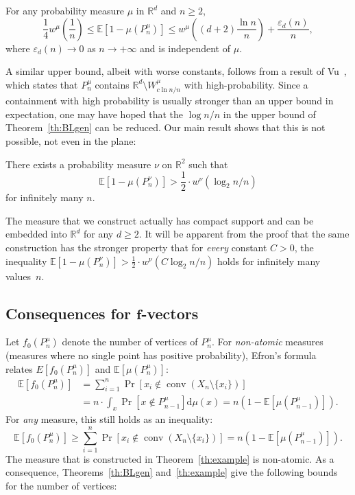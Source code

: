 \documentclass[AHL,Unicode,longabstracts]{cedram}
\DeclareMathOperator{\conv}{conv}
\newcommand*{\dd}{\mathrm{d}}
\newcommand{\Rbb}{\mathbb{R}}%
\newcommand{\Ebb}{\mathbb{E}}%
\newcommand{\ptb}[1]{\left[#1 \right]}
\newcommand*{\mtfrac}[2]{\frac{#1}{#2}}%
\begin{document}
\begin{theo}\label{th:BLgen}
For any probability measure $\mu$ in $\Rbb^d$ and $n \ge 2$,
\[
\frac 14 w^{\mu}\left(\mtfrac1n\right) \le \Ebb[1-\mu(P_n^\mu)] \le w^{\mu}\left({(d+2)\mtfrac{\ln n}n}\right) + \mtfrac{\varepsilon_d(n)}{n},
\]
where $\varepsilon_d(n)\to 0$ as $n\to+\infty$ and is independent of $\mu$.
\end{theo}

A similar upper bound, albeit with worse constants, follows from a result of Vu~\cite[Lemma~4.2]{VanVu}, which states that $P_n^\mu$ contains $\Rbb^d \setminus W_{c\ln n/n}^{\mu}$ with high-probability. Since a containment with high probability is usually stronger than an upper bound in expectation, one may have hoped that the $\log n/n$ in the upper bound of Theorem~\ref{th:BLgen} can be reduced. Our main result shows that this is not possible, not even in the plane:

\begin{theo}\label{th:example}
There exists a probability measure $\nu$ on $\Rbb^2$ such that
\[
\Ebb[1-\mu(P_n^\nu)] > \frac 1{2} \cdot w^\nu(\log_2 n/ n)
\]
for infinitely many $n$.
\end{theo}


The measure that we construct actually has compact support and can be embedded into $\Rbb^d$ for any $d \ge 2$. It will be apparent from the proof that the same construction has the stronger property that for \emph{every} constant $C>0$, the inequality $\Ebb[1-\mu(P_n^\nu)] > \frac 1{2} \cdot w^\nu({C \log_2 n/ n})$ holds for infinitely many values~$n$.


\subsection{Consequences for \texorpdfstring{$\mathbf{f}$}{f}-vectors}\label{f-vectors}

Let $f_0(P_n^\mu)$ denote the number of vertices of $P_n^\mu$. For \emph{non-atomic} measures (measures where no single point has positive probability), Efron's formula~\cite{Ef} relates $E\ptb{f_0(P_n^\mu)}$ and $\Ebb\ptb{\mu(P_n^\mu)}$:
\begin{align}\label{eq:Efron0}
\Ebb [f_0(P_n^\mu)] & = \sum_{i=1}^n \Pr\ptb{x_i \notin \conv(X_n \setminus \{x_i\})}\\
& = n\cdot\int_x \Pr\ptb{x \notin P_{n-1}^\mu}\dd\mu(x) =n(1-\Ebb [\mu(P_{n-1}^\mu)]). \label{eq:Efron}
\end{align}
For \emph{any} measure, this still holds as an inequality:
\begin{equation}\label{eq:Efron2}
\Ebb [f_0(P_n^\mu)] \ge \sum_{i=1}^n \Pr\ptb{x_i \notin \conv(X_n \setminus \{x_i\})} =n(1-\Ebb [\mu(P_{n-1}^\mu)]).
\end{equation}
The measure that is constructed in Theorem~\ref{th:example} is non-atomic. As a consequence, Theorems~\ref{th:BLgen} and~\ref{th:example} give the following bounds for the number of vertices:
\end{document}
